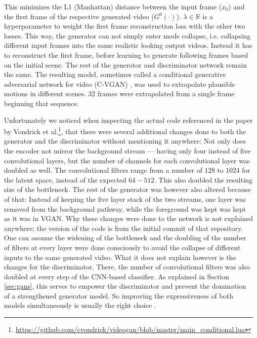 This minimizes the L1 (Manhattan) distance between the input frame ($x_0$) and the first frame of the respective generated video ($G^0(\cdot)$). $\lambda \in \mathbb{R}$ is a hyperparameter to weight the first frame reconstruction loss with the other two losses. This way, the generator can not simply enter mode collapse, i.e. collapsing different input frames into the same realistic looking output videos. Instead it has to reconstruct the first frame, before learning to generate following frames based on the initial scene. The rest of the generator and discriminator network remain the same.  The resulting model, sometimes called a conditional generative adversarial network for video (C-VGAN) \cite{tulyakov2018mocogan}, was used to extrapolate plausible motions in different scenes. $32$ frames were extrapolated from a single frame beginning that sequence. 

Unfortunately we noticed when inspecting the actual code referenced in the paper by Vondrick et al.\footnote{\url{https://github.com/cvondrick/videogan/blob/master/main_conditional.lua}}, that there were several additional changes done to both the generator and the discriminator without mentioning it anywhere: Not only does the encoder not mirror the background stream --- having only four instead of five convolutional layers, but the number of channels for each convolutional layer was doubled as well. The convolutional filters range from a number of $128$ to $1024$ for the latent space, instead of the expected $64-512$. This also doubled the resulting size of the bottleneck. The rest of the generator was however also altered because of that: Instead of keeping the five layer stack of the two streams, one layer was removed from the background pathway, while the foreground was kept was kept as it was in VGAN. Why these changes were done to the network is not explained anywhere; the version of the code is from the initial commit of that repository. One can assume the widening of the bottleneck and the doubling of the number of filters at every layer were done consciously to avoid the collapse of different inputs to the same generated video. What it does not explain however is the changes for the discriminator. There, the number of convolutional filters was also doubled at every step of the CNN-based classifier. As explained in Section \ref{sec:gans}, this serves to empower the discriminator and prevent the domination of a strengthened generator model. So improving the expressiveness of both models simultaneously is usually the right choice \cite{roth2017stabilizing, zhang2018convergence}.\\

